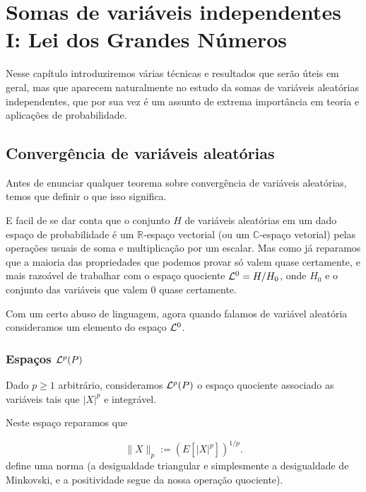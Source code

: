 
\chapter{Somas de variáveis independentes I: Lei dos Grandes Números}

Nesse capítulo introduziremos várias técnicas e resultados que serão úteis em geral, mas que aparecem naturalmente no estudo da somas de variáveis aleatórias independentes, que por sua vez é um assunto de extrema importância em teoria e aplicações de probabilidade.

\section{Convergência de variáveis aleatórias}

Antes de enunciar qualquer teorema sobre convergência de variáveis aleatórias, temos que definir o que isso significa.

\medskip

E facil de se dar conta que o conjunto $H$ de variáveis aleatórias em um dado espaço de probabilidade é um $\mathbb{R}$-espaço vectorial (ou um $\mathbb{C}$-espaço vetorial) pelas operações usuais de soma e  multiplicação por um escalar.
Mas como já reparamos que a maioria das propriedades que podemos provar só valem quase certamente, e mais razoável de trabalhar com o espaço quociente  ${\mathcal L}^0=H/H_0$, onde $H_0$ e o conjunto das variáveis que valem $0$ quase certamente.

\medskip

Com um certo abuso de linguagem,
agora quando falamos de variável aleatória consideramos um elemento do espaço ${\mathcal L}^0$.

\subsection{Espaços ${\mathcal L}^p(P)$}

Dado $p\ge 1$ arbitrário, consideramos ${\mathcal L}^p(P)$ o espaço quociente associado as variáveis tais que $|X|^p$ e integrável.

\medskip

Neste espaço reparamos que

$$\| X\|_p:= \left(E\left [ |X|^p \right]\right)^{1/p}.$$
define uma norma (a desigualdade triangular e simplesmente a desigualdade de Minkovski, e a positividade segue da nossa operação quociente).

\medskip

